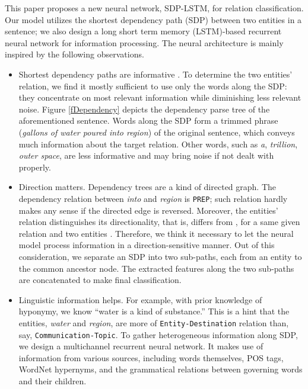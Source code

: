 \documentclass[11pt,a4paper]{article}
\begin{document}
This paper proposes a new neural network, SDP-LSTM, for relation classification.
Our model utilizes the shortest dependency path (SDP) between two entities in a sentence;
we also design a long short term memory (LSTM)-based recurrent neural network for
information processing.
The neural architecture is mainly inspired by the following observations.
\begin{itemize}
\item Shortest dependency paths are informative \cite{relex,deriving}. To determine the two entities' relation,
we find it mostly sufficient
to use only the words along the SDP: they concentrate on most relevant information while diminishing less relevant noise.
Figure \ref{fDependency} depicts the dependency parse tree of the aforementioned sentence.
Words along the SDP form a trimmed phrase (\textit{gallons of water poured into region}) of the original sentence,
which conveys much information about the target relation.
Other words, such as \textit{a}, \textit{trillion}, \textit{outer space},
are less informative and may bring noise if not dealt with properly.

\item Direction matters. Dependency trees are a kind of directed graph. The dependency relation between \textit{into} and \textit{region} is \verb|PREP|; such relation hardly makes any sense if the directed edge is reversed.
Moreover, the entities' relation distinguishes its directionality, that is,
 differs from , for a same given relation  and two entities .
Therefore, we think it necessary to let the neural model
process information in a direction-sensitive manner.
Out of this consideration, we separate an SDP into two sub-paths,
each from an entity to the common ancestor node.
The extracted features along the two sub-paths are concatenated
to make final classification.

\item Linguistic information helps.
For example, with prior knowledge of hyponymy, we know ``water is a kind of substance.''
This is a hint that the entities, \textit{water} and \textit{region},  are more of
\verb|Entity-Destination| relation than, say, \verb|Communication-Topic|.
To gather heterogeneous information along SDP, we design a multichannel recurrent neural network.
It makes use of information from various sources, including words themselves, POS tags, WordNet hypernyms,
and the grammatical relations between governing words
and their children. \end{itemize}
\end{document}
